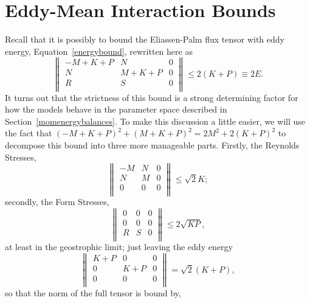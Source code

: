 \documentclass[12pt,a4paper]{report}
\newcommand*\equref[1]{Equation~\eqref{#1}}
\newcommand*\secref[1]{Section~\ref{#1}}
\begin{document}
\section{Eddy-Mean Interaction Bounds}

Recall that it is possibly to bound the Eliassen-Palm flux tensor with eddy energy, \equref{energybound}, rewritten here as
\begin{equation}
{\left\|\begin{array}{ccc}
		-M + K + P & N & 0 \\
		N & M + K + P& 0 \\
		R & S & 0 \\
		\end{array}\right\|\leq 2\left(K+P\right)\equiv 2E}.
\end{equation} 
It turns out that the strictness of this bound is
a strong determining factor for how the models behave in the parameter space described in
\secref{momenergybalances}. To make this discussion a little easier, we will use the
fact that $(-M + K + P)^{2}+(M + K + P)^{2} = 2M^{2}+ 2(K + P)^{2}$ to decompose
this bound into three more manageable parts. Firstly, the Reynolds Stresses,
\begin{equation}
{\left\|\begin{array}{ccc}
	-M & N & 0\\
	N & M & 0\\
	0 & 0 & 0\\
	\end{array}\right\|\leq \sqrt{2}K};
\label{reynoldbound}
\end{equation} 
secondly, the Form Stresses,
\begin{equation}
{\left\|\begin{array}{ccc}
	0 & 0 & 0\\
	0 & 0 & 0\\
	R & S & 0\\
	\end{array}\right\|\leq 2\sqrt{KP}},
\end{equation} 
at least in the geostrophic limit;
just leaving the eddy energy
\begin{equation}
{\left\|\begin{array}{ccc}
	K + P & 0 & 0 \\
	0 & K + P & 0\\
	0 & 0 & 0\\
	\end{array}\right\| = \sqrt{2}(K + P)},
\label{formbound}
\end{equation} 
so that the norm of the full tensor is bound by,
\end{document}
